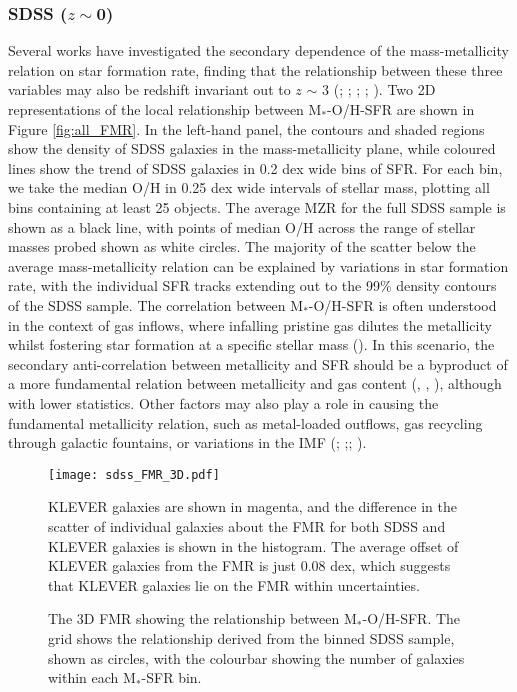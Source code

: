 \documentclass[usenatbib]{mnras} %
\begin{document}
\subsubsection{SDSS ($z\sim$0)}\label{FMR_sec}
Several works have investigated the secondary dependence of the mass-metallicity relation on star formation rate, finding that the relationship between these three variables may also be redshift invariant out to $z$ $\sim$ 3 (\citealt{Mannucci_2010}; \citealt{AndrewsMartini_2013}; \citealt{Cresci_2019}; \citealt{Curti_2020FMR}; \citealt{Sanders_2020FMR}). Two 2D representations of the local relationship between M$_*$-O/H-SFR are shown in Figure \ref{fig:all_FMR}. In the left-hand panel, the contours and shaded regions show the density of SDSS galaxies in the mass-metallicity plane, while coloured lines show the trend of SDSS galaxies in 0.2 dex wide bins of SFR. For each bin, we take the median O/H in 0.25 dex wide intervals of stellar mass, plotting all bins containing at least 25 objects. The average MZR for the full SDSS sample is shown as a black line, with points of median O/H across the range of stellar masses probed shown as white circles. The majority of the scatter below the average mass-metallicity relation can be explained by variations in star formation rate, with the individual SFR tracks extending out to the 99\% density contours of the SDSS sample. The correlation between M$_*$-O/H-SFR is often understood in the context of gas inflows, where infalling pristine gas dilutes the metallicity whilst fostering star formation at a specific stellar mass (\citealt{Dave_2011}). In this scenario, the secondary anti-correlation between metallicity and SFR should be a byproduct of a more fundamental relation between metallicity and gas content (\citealt{Bothwell_2013}, \citeyear{Bothwell_2016a}, \citeyear{Bothwell_2016b}), although with lower statistics.  Other factors may also play a role in causing the fundamental metallicity relation, such as metal-loaded outflows, gas recycling through galactic fountains, or variations in the IMF (\citealt{Tremonti_2004}; \citealt{Koppen_2007};\citealt{Dave_2011}; \citealt{Sanders_2020FMR}).



\begin{figure*}
    \centering
    \texttt{[image: sdss\_FMR\_3D.pdf]} \par
    \caption{The 3D FMR showing the relationship between M$_*$-O/H-SFR. The grid shows the relationship derived from the binned SDSS sample, shown as circles, with the colourbar showing the number of galaxies within each M$_*$-SFR bin.} KLEVER galaxies are shown in magenta, and the difference in the scatter of individual galaxies about the FMR for both SDSS and KLEVER galaxies is shown in the histogram. The average offset of KLEVER galaxies from the FMR is just 0.08 dex, which suggests that KLEVER galaxies lie on the FMR within uncertainties.
    \label{fig:FMR_3D}
\end{figure*}
\end{document}

